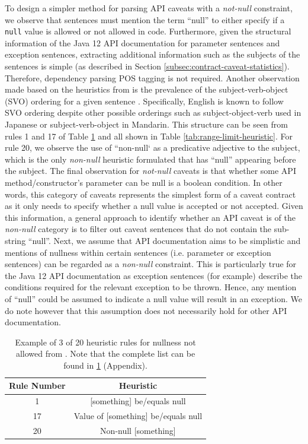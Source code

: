 To design a simpler method for parsing API caveats with a \textit{not-null} constraint, we observe that sentences must mention the term ``null'' to either specify if a \lstinline{null} value is allowed or not allowed in code. Furthermore, given the structural information of the Java 12 API documentation for parameter sentences and exception sentences, extracting additional information such as the subjects of the sentences is simple (as described in Section \ref{subsec:contract-caveat-statistics}). Therefore, dependency parsing POS tagging is not required. Another observation made based on the heuristics from \cite{zhou-directive} is the prevalence of the subject-verb-object (SVO) ordering for a given sentence \cite{dryer200581}. Specifically, English is known to follow SVO ordering despite other possible orderings such as subject-object-verb used in Japanese or subject-verb-object in Mandarin. This structure can be seen from rules 1 and 17 of Table \ref{tab:not-null-heuristic} and all shown in Table \ref{tab:range-limit-heuristic}. For rule 20, we observe the use of ``non-null` as a predicative adjective to the subject, which is the only \textit{non-null} heuristic formulated that has ``null'' appearing before the subject. The final observation for \textit{not-null} caveats is that whether some API method/constructor's parameter can be null is a boolean condition. In other words, this category of caveats represents the simplest form of a caveat contract as it only needs to specify whether a null value is accepted or not accepted. Given this information, a general approach to identify whether an API caveat is of the \textit{non-null} category is to filter out caveat sentences that do not contain the sub-string ``null''. Next, we assume that API documentation aims to be simplistic and mentions of nullness within certain sentences (i.e. parameter or exception sentences) can be regarded as a \textit{non-null} constraint. This is particularly true for the Java 12 API documentation as exception sentences (for example) describe the conditions required for the relevant exception to be thrown. Hence, any mention of ``null'' could be assumed to indicate a null value will result in an exception. We do note however that this assumption does not necessarily hold for other API documentation. \\

\begin{table}[h]
	\centering
	\begin{tabular}{|cc|}
		\hline
		Rule Number & Heuristic \\ \hline
		1 & [something] be/equals null \\
		17 & Value of [something] be/equals null \\
		20 & Non-null [something] \\ \hline
	\end{tabular}
	\caption{Example of 3 of 20 heuristic rules for nullness not allowed from \cite{zhou-directive}. Note that the complete list can be found in \ref{tab:not-null-heuristic} (Appendix).}
	\label{tab:not-null-heuristic}
\end{table}

